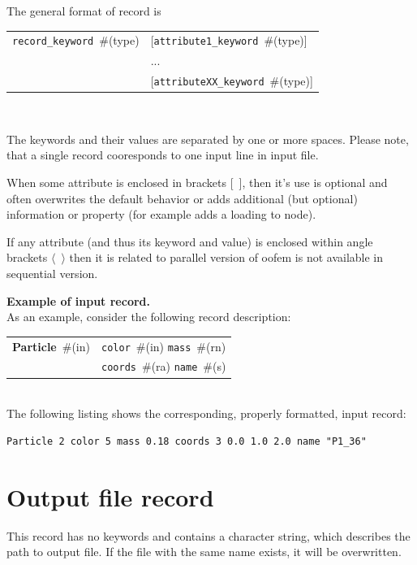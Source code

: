 \documentclass[a4paper]{article}
\makeatletter
\newcommand{\param}[1]{\texttt{#1}} %
\newcommand{\optional}[1]{[#1]} %
\newcommand{\field}[2]{\param{#1}~\#{\tiny(#2)}} %
\newcommand{\optField}[2]{\optional{\field{#1}{#2}}}
\newcommand{\entKeywordInstWithVal}[2]{\textbf{#1}~\#{\tiny(#2)}} %
\newcommand{\Pmode}[1]{{\sffamily #1}}
\newenvironment{record}[1][]{\begin{tabular}{|ll}}{\end{tabular}\\}
\newcommand{\recentry}[2]{{#1}&{#2}\\}
\newcounter{rcc}
\newenvironment{record}[1][\textwidth]{\setcounter{rcc}{0}\begin{tabular*}{#1}{|ll@{\extracolsep{\fill}}r}}{\end{tabular*}\\}
\newcommand{\recentry}[2]{\ifthenelse{\value{rcc}>0}{&$\backslash$ \\}{\setcounter{rcc}{1}}{#1}&{#2}}
\makeatother
\begin{document}
The general format of record is \\

\noindent
\begin{record}
  \recentry{\field{record\_keyword}{type}}{\optField{attribute1\_keyword}{type}}
  \recentry{}{...}
  \recentry{}{\optField{attributeXX\_keyword}{type}}
\end{record}

The keywords and their values are separated by one or more spaces. Please note, that a single record cooresponds to one input line in input file. 


When some attribute is enclosed in brackets [~], then it's use is optional
and often overwrites the default behavior or adds additional (but
optional) information or property (for example adds a loading to
node).

\Pmode{If any attribute (and thus its keyword and value) is enclosed within angle brackets $\langle$~$\rangle$ then it is related to parallel version of oofem is not available in sequential version.}

{\flushleft \bf Example of input record.}\\
As an example, consider the following record description:\\
\begin{record}
  \recentry{\entKeywordInstWithVal{Particle}{in}}{\field{color}{in} \field{mass}{rn}}
  \recentry{}{\field{coords}{ra} \field{name}{s}}
\end{record}
The following listing shows the corresponding, properly formatted, input record:
\begin{lstlisting}[style=oofem, language=oofeminput, caption={Corresponding input record}, moreemph={color, mass, name}, morekeywords={Particle}]
Particle 2 color 5 mass 0.18 coords 3 0.0 1.0 2.0 name "P1_36"
\end{lstlisting}



\section{Output file record}
\label{_OutputFileRecord}
This record has no keywords and contains a character string, which
describes the path to output file. If the file with the same name exists,
it will be overwritten.
\end{document}
